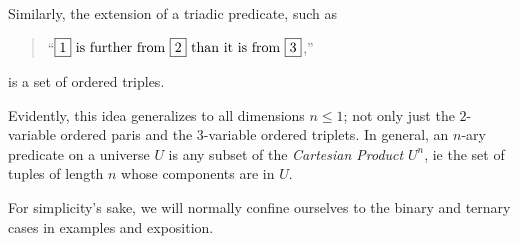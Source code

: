 Similarly, the extension of a triadic predicate, such as 
\begin{quote}
``$\fbox{1}\ \mathrm{is\
further\ from}\ \fbox{2}\ \mathrm{than\ it\ is\ from}\ \fbox{3}$,'' 
\end{quote}
is a set of
ordered triples.

Evidently, this idea generalizes to all dimensions $n \leq 1$; not only just the $2$-variable ordered paris and the $3$-variable ordered triplets. In general, an $n$-ary predicate on a universe $U$ is any subset of the \emph{Cartesian Product} $U^n$, ie the set of tuples of length $n$ whose components are in $U$. 

For simplicity's sake, we will normally confine ourselves to the binary and ternary cases in examples and exposition. 